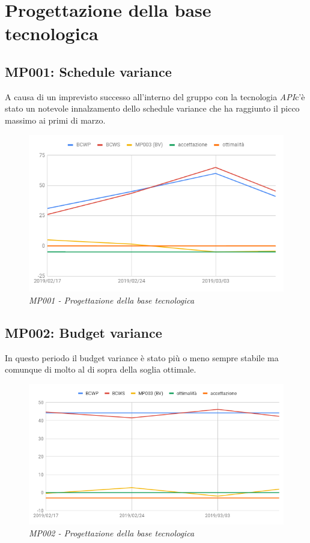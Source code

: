 \section{Progettazione della base tecnologica}
\label{progettazione}
\subsection{MP001: Schedule variance}
A causa di un imprevisto successo all'interno del gruppo con la tecnologia \textit{API}c'è stato un notevole innalzamento dello schedule variance che ha raggiunto il picco massimo ai primi di marzo.
\begin{figure} [H]
    \centering
	\includegraphics[scale=0.6]{./images/svP.png}
	\caption{\textit{MP001 - Progettazione della base tecnologica}}\label{}
\end{figure}

\subsection{MP002: Budget variance}
In questo periodo il budget variance è stato più o meno sempre stabile ma comunque di molto al di sopra della soglia ottimale.
\begin{figure} [H]
    \centering
	\includegraphics[scale=0.5]{./images/bvP.png}
	\caption{\textit{MP002 - Progettazione della base tecnologica}}\label{}
\end{figure}

